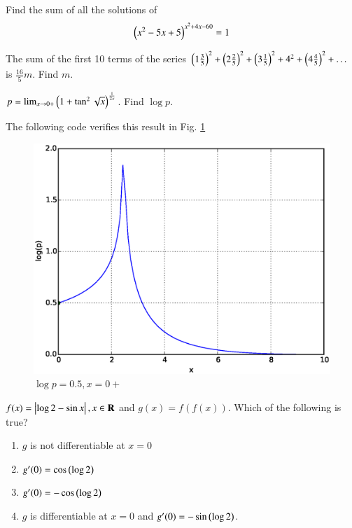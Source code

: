 \documentclass[journal,12pt,twocolumn]{IEEEtran}
\begin{document}
%
\begin{problem}
Find the sum of all the solutions of 
\begin{equation*}
\left(x^2-5x+5\right)^{x^2+4x-60}=1
\end{equation*}
\end{problem}
\solution


%
\begin{problem}
The sum of the first 10 terms of the series $\left(1\frac{3}{5}\right)^2+\left(2\frac{2}{5}\right)^2+\left(3\frac{1}{5}\right)^2+4^2+\left(4\frac{4}{5}\right)^2 + \dots $ is $\frac{16}{5}m$.  Find $m$.
\end{problem}
\solution


%
\begin{problem}
$p = \lim_{x \rightarrow 0+}\left(1+\tan^2\sqrt{x}\right)^{\frac{1}{2x}}$. Find  $\log p$.
\end{problem}
\solution 

The following code verifies this result in Fig. \ref{fig_29}

%
\begin{figure}[h]
\centering
\includegraphics[width=\columnwidth]{./figs/ee16b1029}
\caption{ $\log p = 0.5, x = 0+$}
\label{fig_29}	
\end{figure}
%
\begin{problem}
$f(x) = \left\vert\log 2 - \sin x\right\vert, x \in \mathbf{R}$ and $g(x)=f(f(x))$.  Which of the following is true?
\begin{enumerate}
\item $g$ is not differentiable at $x=0$
\item $g^{\prime}(0) = \cos \left(\log 2\right)$
\item $g^{\prime}(0) = -\cos \left(\log 2\right)$
\item $g$ is differentiable at $x=0$ and $g^{\prime }(0) = -\sin \left(\log 2\right)$.
\end{enumerate}
\end{problem}
\end{document}
